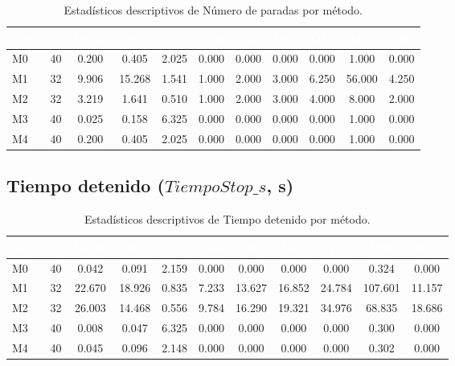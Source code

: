 \documentclass[12pt,a4paper,oneside]{book}
\begin{document}
\begin{table}[H]
\centering
\caption{Estadísticos descriptivos de Número de paradas por método.}
\renewcommand{\arraystretch}{1.25}
\small
\begin{tabular}{lcccccccccc}
\toprule
\rowcolor{primary}
\textcolor{white}{\textbf{Mét.}} & \textcolor{white}{\textbf{n}} & \textcolor{white}{\textbf{Media}} & \textcolor{white}{\textbf{SD}} & \textcolor{white}{\textbf{CV}} & \textcolor{white}{\textbf{Mín}} & \textcolor{white}{\textbf{Q25}} & \textcolor{white}{\textbf{Med}} & \textcolor{white}{\textbf{Q75}} & \textcolor{white}{\textbf{Máx}} & \textcolor{white}{\textbf{IQR}} \\
\midrule
M0 & 40 & 0.200 & 0.405 & 2.025 & 0.000 & 0.000 & 0.000 & 0.000 & 1.000 & 0.000 \\
M1 & 32 & 9.906 & 15.268 & 1.541 & 1.000 & 2.000 & 3.000 & 6.250 & 56.000 & 4.250 \\
M2 & 32 & 3.219 & 1.641 & 0.510 & 1.000 & 2.000 & 3.000 & 4.000 & 8.000 & 2.000 \\
M3 & 40 & 0.025 & 0.158 & 6.325 & 0.000 & 0.000 & 0.000 & 0.000 & 1.000 & 0.000 \\
M4 & 40 & 0.200 & 0.405 & 2.025 & 0.000 & 0.000 & 0.000 & 0.000 & 1.000 & 0.000 \\
\bottomrule
\end{tabular}
\end{table}

\subsection{Tiempo detenido ($\textit{TiempoStop\_s}$, s)}

\begin{table}[H]
\centering
\caption{Estadísticos descriptivos de Tiempo detenido por método.}
\renewcommand{\arraystretch}{1.25}
\small
\begin{tabular}{lcccccccccc}
\toprule
\rowcolor{primary}
\textcolor{white}{\textbf{Mét.}} & \textcolor{white}{\textbf{n}} & \textcolor{white}{\textbf{Media}} & \textcolor{white}{\textbf{SD}} & \textcolor{white}{\textbf{CV}} & \textcolor{white}{\textbf{Mín}} & \textcolor{white}{\textbf{Q25}} & \textcolor{white}{\textbf{Med}} & \textcolor{white}{\textbf{Q75}} & \textcolor{white}{\textbf{Máx}} & \textcolor{white}{\textbf{IQR}} \\
\midrule
M0 & 40 & 0.042 & 0.091 & 2.159 & 0.000 & 0.000 & 0.000 & 0.000 & 0.324 & 0.000 \\
M1 & 32 & 22.670 & 18.926 & 0.835 & 7.233 & 13.627 & 16.852 & 24.784 & 107.601 & 11.157 \\
M2 & 32 & 26.003 & 14.468 & 0.556 & 9.784 & 16.290 & 19.321 & 34.976 & 68.835 & 18.686 \\
M3 & 40 & 0.008 & 0.047 & 6.325 & 0.000 & 0.000 & 0.000 & 0.000 & 0.300 & 0.000 \\
M4 & 40 & 0.045 & 0.096 & 2.148 & 0.000 & 0.000 & 0.000 & 0.000 & 0.302 & 0.000 \\
\bottomrule
\end{tabular}
\end{table}
\end{document}
